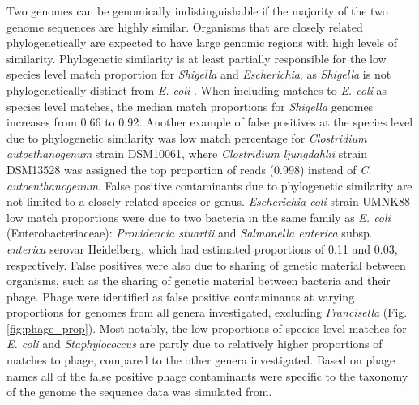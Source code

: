 \documentclass[fleqn,10pt,lineno]{wlpeerj}\usepackage[]{graphicx}\usepackage[]{color}
\begin{document}
Two genomes can be genomically indistinguishable if the majority of the two genome sequences are highly similar.
Organisms that are closely related phylogenetically are expected to have large genomic regions with high levels of similarity. 
Phylogenetic similarity is at least partially responsible for the low species level match proportion for  \textit{Shigella} and \textit{Escherichia}, as \textit{Shigella} is not phylogenetically distinct from \textit{E. coli} \citep{lan2002escherichia}.
When including matches to \textit{E. coli} as species level matches, the median match proportions for \textit{Shigella} genomes increases from 0.66 to 0.92. 
Another example of false positives at the species level due to phylogenetic similarity was low match percentage for \textit{Clostridium autoethanogenum} strain DSM10061, where \textit{Clostridium ljungdahlii} strain DSM13528 was assigned the top proportion of reads (0.998) instead of \textit{C. autoenthanogenum}. 
False positive contaminants due to phylogenetic similarity are not limited to a closely related species or genus.
\textit{Escherichia coli} strain UMNK88 low match proportions were due to two bacteria in the same family as \textit{E. coli} 
(Enterobacteriaceae): \textit{Providencia stuartii} and \textit{Salmonella enterica} subsp. \textit{enterica} serovar Heidelberg, which had estimated proportions of 0.11 and 0.03, respectively. 
False positives were also due to sharing of genetic material between organisms, such as the sharing of genetic material between bacteria and their phage. 
Phage were identified as false positive contaminants at varying proportions for genomes from all genera investigated, excluding \textit{Francisella} (Fig. \ref{fig:phage_prop}). 
Most notably, the low proportions of species level matches for \textit{E. coli} and \textit{Staphylococcus} are partly due to relatively higher proportions of matches to phage, compared to the other genera investigated. 
Based on phage names all of the false positive phage contaminants were specific to the taxonomy of the genome the sequence data was simulated from.  


\end{document}
